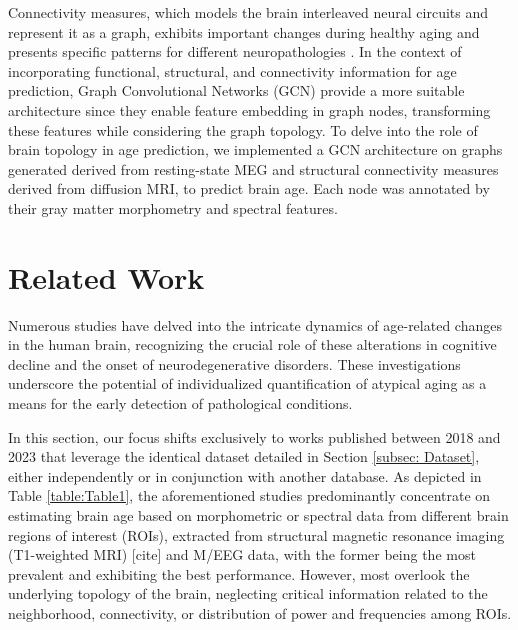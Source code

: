 \documentclass{cys}
\begin{document}
\bigskip
Connectivity measures, which models the brain interleaved neural circuits and represent it as a graph, exhibits important changes during healthy aging and presents specific patterns for different neuropathologies \cite{monti2020interpretable, li2018brain, lin2016predicting}. In the context of incorporating functional, structural, and connectivity information for age prediction, Graph Convolutional Networks (GCN) provide a more suitable architecture since they enable feature embedding in graph nodes, transforming these features while considering the graph topology. To delve into the role of brain topology in age prediction, we implemented a GCN architecture on graphs generated derived from resting-state MEG and structural connectivity measures derived from diffusion MRI, to predict brain age. Each node was annotated by their gray matter morphometry  and spectral features. %



\section{Related Work}
\label{sec:relatedWork}

Numerous studies have delved into the intricate dynamics of age-related changes in the human brain, recognizing the crucial role of these alterations in cognitive decline and the onset of neurodegenerative disorders. These investigations underscore the potential of individualized quantification of atypical aging as a means for the early detection of pathological conditions.

\bigskip
In this section, our focus shifts exclusively to works published between 2018 and 2023 that leverage the identical dataset detailed in Section \ref{subsec: Dataset}, either independently or in conjunction with another database. As depicted in Table \ref{table:Table1}, the aforementioned studies predominantly concentrate on estimating brain age based on morphometric or spectral data from different brain regions of interest (ROIs), extracted from structural magnetic resonance imaging (T1-weighted MRI) [cite] and M/EEG data, with the former being the most prevalent and exhibiting the best performance. However, most overlook the underlying topology of the brain, neglecting critical information related to the neighborhood, connectivity, or distribution of power and frequencies among ROIs.
\end{document}
